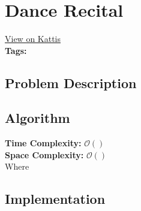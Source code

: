 \section{Dance Recital}
\label{dancerecital}
\href{https://open.kattis.com/problems/}{View on Kattis}\\
\textbf{Tags:} \\
\subsection{Problem Description}
\subsection{Algorithm}
\hfill\break
\textbf{Time Complexity:} $\mathcal{O}()$\\
\textbf{Space Complexity:} $\mathcal{O}()$\\
Where
\subsection{Implementation}

\pagebreak
